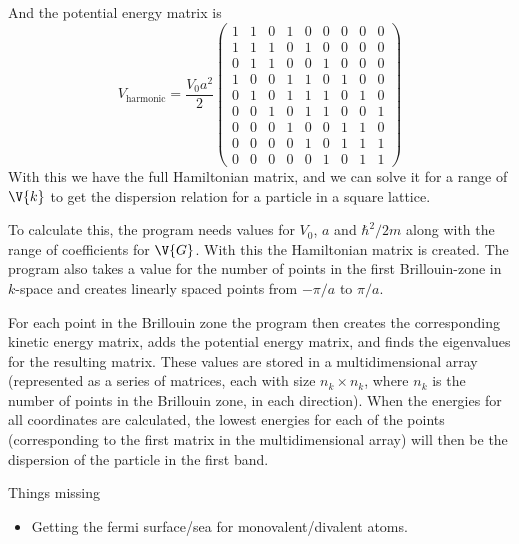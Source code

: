 \documentclass[main.tex]{subfiles}
\begin{document}
	And the potential energy matrix is
	\begin{equation}
		V_{\text{harmonic}} = \frac{V_0 a^2}{2} \begin{pmatrix}
		1 & 1 & 0 & 1 & 0 & 0 & 0 & 0 & 0 \\
		1 & 1 & 1 & 0 & 1 & 0 & 0 & 0 & 0 \\
		0 & 1 & 1 & 0 & 0 & 1 & 0 & 0 & 0 \\
		1 & 0 & 0 & 1 & 1 & 0 & 1 & 0 & 0 \\
		0 & 1 & 0 & 1 & 1 & 1 & 0 & 1 & 0 \\
		0 & 0 & 1 & 0 & 1 & 1 & 0 & 0 & 1 \\
		0 & 0 & 0 & 1 & 0 & 0 & 1 & 1 & 0 \\
		0 & 0 & 0 & 0 & 1 & 0 & 1 & 1 & 1 \\
		0 & 0 & 0 & 0 & 0 & 1 & 0 & 1 & 1
		\end{pmatrix}
	\end{equation}
	With this we have the full Hamiltonian matrix, and we can solve it for a range of $ \V{k} $ to get the dispersion relation for a particle in a square lattice.
	
	To calculate this, the program needs values for $ V_0 $, $ a $ and $ \hbar^2/2m $ along with the range of coefficients for $ \V{G} $. With this the Hamiltonian matrix is created. The program also takes a value for the number of points in the first Brillouin-zone in $ k $-space and creates linearly spaced points from $ -\pi/a $ to $ \pi/a $.
	
	For each point in the Brillouin zone the program then creates the corresponding kinetic energy matrix, adds the potential energy matrix, and finds the eigenvalues for the resulting matrix. These values are stored in a multidimensional array (represented as a series of matrices, each with size $ n_k \times n_k $, where $ n_k $ is the number of points in the Brillouin zone, in each direction). When the energies for all coordinates are calculated, the lowest energies for each of the points (corresponding to the first matrix in the multidimensional array) will then be the dispersion of the particle in the first band.
	
	Things missing
	\begin{itemize}
		\item Getting the fermi surface/sea for monovalent/divalent atoms.
	\end{itemize}
	
	
\end{document}
